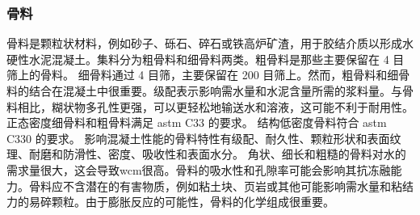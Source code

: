 \subsubsection{骨料}
骨料是颗粒状材料，例如砂子、砾石、碎石或铁高炉矿渣，用于胶结介质以形成水硬性水泥混凝土。集料分为粗骨料和细骨料两类。粗骨料是那些主要保留在 4 目筛上的骨料。 细骨料通过 4 目筛，主要保留在 200 目筛上。然而，粗骨料和细骨料的结合在混凝土中很重要。级配表示影响需水量和水泥含量所需的浆料量。与骨料相比，糊状物多孔性更强，可以更轻松地输送水和溶液，这可能不利于耐用性。正态密度细骨料和粗骨料满足 \acrshort*{astm} C33 的要求。 结构低密度骨料符合 \acrshort*{astm} C330 的要求。 影响混凝土性能的骨料特性有级配、耐久性、颗粒形状和表面纹理、耐磨和防滑性、密度、吸收性和表面水分。 角状、细长和粗糙的骨料对水的需求量很大，这会导致\acrlong*{wcm}很高。骨料的吸水性和孔隙率可能会影响其抗冻融能力。骨料应不含潜在的有害物质，例如粘土块、页岩或其他可能影响需水量和粘结力的易碎颗粒。由于膨胀反应的可能性，骨料的化学组成很重要。

